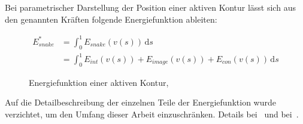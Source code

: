 Bei parametrischer Darstellung der Position einer aktiven Kontur lässt sich aus den genannten Kräften folgende Energiefunktion ableiten:

\begin{figure}[H]
    \renewcommand\figurename{Auflistung}
    \begin{align}
        E_{snake}^* & = \int_0^1 E_{snake}(v(s))\, \mathrm{d}s\\
         & = \int_0^1 E_{int}(v(s)) + E_{image}(v(s)) + E_{con}(v(s))\, \mathrm{d}s
    \end{align}
    \caption{Energiefunktion einer aktiven Kontur,~\cite{kass88snakes:active}}
\end{figure}

Auf die Detailbeschreibung der einzelnen Teile der Energiefunktion wurde verzichtet, um den Umfang dieser Arbeit einzuschränken. Details bei~\citet[S. 247]{hudritsch:script:cp} und bei~\citet[S. 323 bis 328]{kass88snakes:active}.  %
